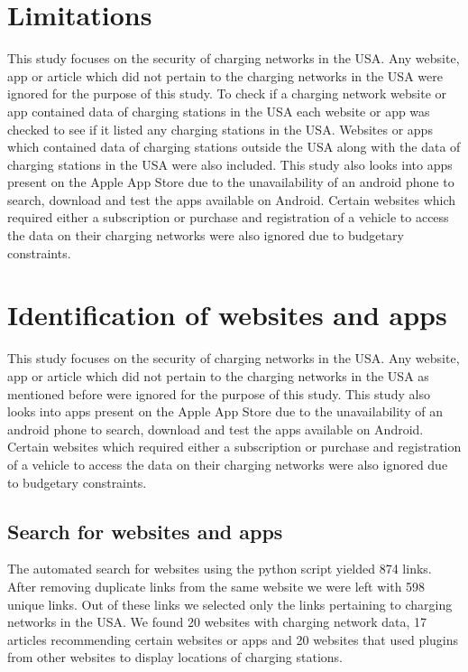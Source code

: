 \documentclass[conference]{IEEEtran}
\begin{document}
\section{Limitations}
This study focuses on the security of charging networks in the USA. Any website, app or article which did not pertain to the charging networks in the USA were ignored for the purpose of this study. To check if a charging network website or app contained data of charging stations in the USA each website or app was checked to see if it listed any charging stations in the USA. Websites or apps which contained data of charging stations outside the USA along with the data of charging stations in the USA were also included.  This study also looks into apps present on the Apple App Store due to the unavailability of an android phone to search, download and test the apps available on Android. Certain websites which required either a subscription or purchase and registration of a vehicle to access the data on their charging networks were also ignored due to budgetary constraints.

\section{Identification of websites and apps}
This study focuses on the security of charging networks in the USA. Any website, app or article which did not pertain to the charging networks in the USA as mentioned before were ignored for the purpose of this study. This study also looks into apps present on the Apple App Store due to the unavailability of an android phone to search, download and test the apps available on Android. Certain websites which required either a subscription or purchase and registration of a vehicle to access the data on their charging networks were also ignored due to budgetary constraints.

\subsection{Search for websites and apps}
The automated search for websites using the python script yielded 874 links. After removing duplicate links from the same website we were left with 598 unique links. Out of these links we selected only the links pertaining to charging networks in the USA. We found 20 websites with charging network data, 17 articles recommending certain websites or apps and 20 websites that used plugins from other websites to display locations of charging stations.
\end{document}
